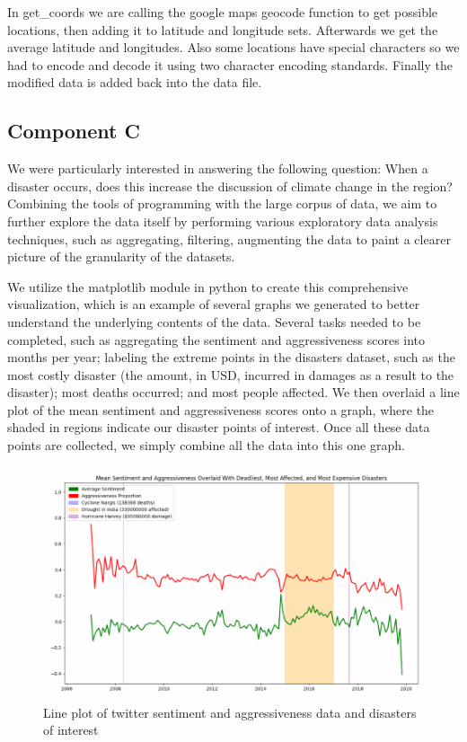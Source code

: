 \documentclass[pdflatex,sn-mathphys-num]{sn-jnl}%
\theoremstyle{thmstyleone}%
\theoremstyle{thmstyletwo}%
\theoremstyle{thmstylethree}%
\begin{document}
In get\_coords we are calling the google maps geocode function to get possible locations, then adding it to latitude and longitude sets. Afterwards we get the average latitude and longitudes. Also some locations have special characters so we had to encode and decode it using two character encoding standards. Finally the modified data is added back into the data file.


\subsection{Component C}\label{subsec9}
We were particularly interested in answering the following question: When a disaster occurs, does this increase the discussion of climate change in the region? Combining the tools of programming with the large corpus of data, we aim to further explore the data itself by performing various exploratory data analysis techniques, such as aggregating, filtering, augmenting the data to paint a clearer picture of the granularity of the datasets.

We utilize the matplotlib module in python to create this comprehensive visualization, which is an example of several graphs we generated to better understand the underlying contents of the data. Several tasks needed to be completed, such as aggregating the sentiment and aggressiveness scores into months per year; labeling the extreme points in the disasters dataset, such as the most costly disaster (the amount, in USD, incurred in damages as a result to the disaster); most deaths occurred; and most people affected. We then overlaid a line plot of the mean sentiment and aggressiveness scores onto a graph, where the shaded in regions indicate our disaster points of interest. Once all these data points are collected, we simply combine all the data into this one graph.

\begin{figure}[H]
\centering
\includegraphics[width=12cm]{images/climatechangepulse5.PNG}
\caption{Line plot of twitter sentiment and aggressiveness data and disasters of interest}
\end{figure}
\end{document}
